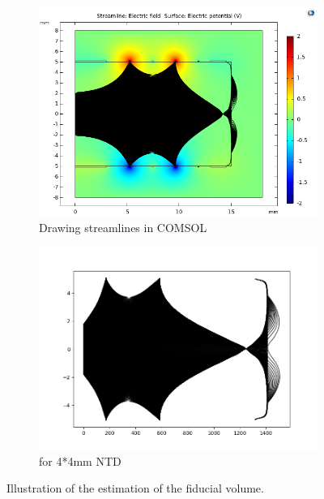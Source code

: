 \begin{figure}
\centering
\begin{subfigure}{.5\textwidth}
  \centering
  \includegraphics[width=\linewidth]{Figures/Electrodes/streamlines_comsol.png}
  \caption{Drawing streamlines in COMSOL}
  \label{fig:streamlines-comsol}
\end{subfigure}%
\begin{subfigure}{0.5\textwidth}
  \centering
  \includegraphics[width=\linewidth]{Figures/Electrodes/streamlines_corrected.png}
  \caption{for 4*4mm NTD}
  \label{fig:streamlines-corrected}
\end{subfigure}
\caption{Illustration of the estimation of the fiducial volume.}
\label{fig:fiducial-volume-estimation}
\end{figure}

